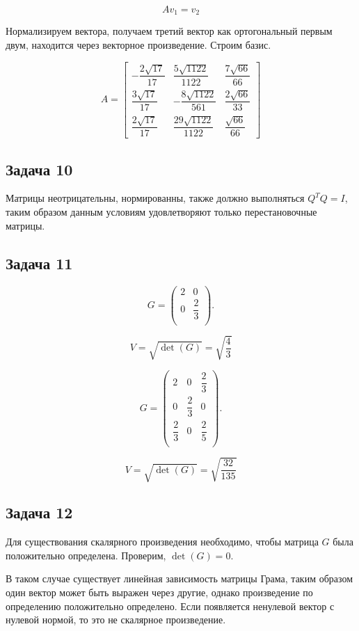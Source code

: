 \documentclass[a4paper,12pt]{article}
\begin{document}
\[
Av_1 = v_2
\]

Нормализируем вектора, получаем третий вектор как ортогональный первым двум, находится через векторное произведение. Строим базис.

\[
A =
\begin{bmatrix}
-\dfrac{2\sqrt{17}}{17} & \dfrac{5\sqrt{1122}}{1122} & \dfrac{7\sqrt{66}}{66} \\
\dfrac{3\sqrt{17}}{17} & -\dfrac{8\sqrt{1122}}{561} & \dfrac{2\sqrt{66}}{33} \\
\dfrac{2\sqrt{17}}{17} & \dfrac{29\sqrt{1122}}{1122} & \dfrac{\sqrt{66}}{66}
\end{bmatrix}
\]

\subsection{Задача 10}

Матрицы неотрицательны, нормированны, также должно выполняться \( Q^T Q = I \), таким образом данным условиям удовлетворяют только перестановочные матрицы.

\subsection{Задача 11}

\[
G = \begin{pmatrix}
2 & 0 \\
0 & \dfrac{2}{3} \\
\end{pmatrix}.
\]

\[
V = \sqrt{\det(G)} = \sqrt{\dfrac{4}{3}}
\]

\[
G = \begin{pmatrix}
2 & 0 & \dfrac{2}{3} \\
0 & \dfrac{2}{3} & 0 \\
\dfrac{2}{3} & 0 & \dfrac{2}{5} \\
\end{pmatrix}.
\]

\[
V = \sqrt{\det(G)} = \sqrt{\dfrac{32}{135}}
\]

\subsection{Задача 12}

Для существования скалярного произведения необходимо, чтобы матрица \( G \) была положительно определена. Проверим, \( \det(G) = 0 \).

В таком случае существует линейная зависимость матрицы Грама, таким образом один вектор может быть выражен через другие, однако произведение по определению положительно определено. Если появляется ненулевой вектор с нулевой нормой, то это не скалярное произведение.
\end{document}
